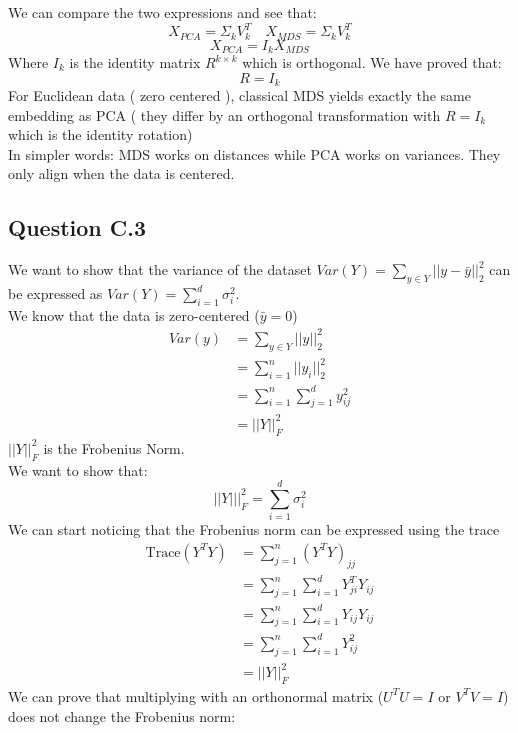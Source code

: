 \documentclass[a4paper]{scrartcl}
\newcommand{\tr}{\text{Trace}}
\begin{document}
We can compare the two expressions and see that:
\[
X_{PCA} = \Sigma_k V_k^T \quad X_{MDS} = \Sigma_k V_k^T
\]
\[
X_{PCA} = I_k X_{MDS}
\]
Where $I_k$ is the identity matrix $R^{k \times k}$ which is orthogonal.
We have proved that:
\[
R = I_k
\]
For Euclidean data ( zero centered ), classical MDS yields exactly the same embedding as PCA ( they differ by an orthogonal transformation with $R=I_k$ which is the identity rotation)\\
In simpler words: MDS works on distances while PCA works on variances. They only align when the data is centered.
\subsection*{Question C.3}
We want to show that the variance of the dataset $Var(Y) = \sum_{y \in Y} || y - \bar{y}||_2^2$ can be expressed as $Var(Y) = \sum_{i=1}^d \sigma_i^2$.\\
We know that the data is zero-centered ($\bar{y}=0$)\\
\begin{align*}
    Var(y) &= \sum_{y \in Y} ||y||^2_2\\
    &= \sum_{i=1}^{n} ||y_i||^2_2\\
    &= \sum_{i=1}^{n} \sum_{j=1}^{d} y_{ij}^2\\
    &= || Y ||^2_F
\end{align*}
$|| Y ||^2_F$ is the Frobenius Norm.\\
We want to show that:
\[
|| Y |||_F^2 = \sum_{i=1}^{d} \sigma_i^2
\]
We can start noticing that the Frobenius norm can be expressed using the trace
\begin{align*}
    \tr(Y^T Y) &= \sum_{j=1}^{n} (Y^T Y)_{jj}\\
    &= \sum_{j=1}^{n} \sum_{i=1}^{d} Y_{ji}^T Y_{ij}\\
    &= \sum_{j=1}^{n} \sum_{i=1}^{d} Y_{ij} Y_{ij}\\
    &= \sum_{j=1}^{n} \sum_{i=1}^{d} Y_{ij}^2\\
    &= ||Y||_F^2
\end{align*}
We can prove that multiplying with an orthonormal matrix ($U^TU=I$ or $V^TV = I$) does not change the Frobenius norm:
\end{document}
